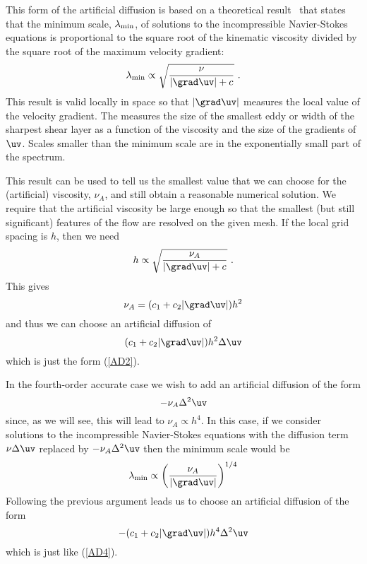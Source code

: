 This form of the artificial diffusion is based on a theoretical
result~\cite{HKR1}\cite{HKR2}
that states that the minimum scale,  $\lambda_{\rm min}$,
 of solutions to the incompressible
Navier-Stokes equations
is proportional to the square
root of the kinematic viscosity divided by the square root of the
maximum velocity gradient:
$$
   \lambda_{\rm min} \propto \sqrt{ \nu \over | \grad\uv | + c} ~.
$$
This result is valid locally in space so that $|\grad\uv|$ measures
the local value of the velocity gradient.
The  measures the
size of the smallest eddy or width of the sharpest shear layer as a
function of the viscosity and the size of the gradients of $\uv$.
Scales smaller than the minimum scale are in the exponentially small
part of the spectrum.

This result can be used to tell us the smallest value that we
can choose for the
(artificial) viscosity, $\nu_A$, and still obtain a reasonable
numerical  solution.
We require that the artificial viscosity
be large enough so that the smallest (but still significant)
features of the flow are resolved
on the given mesh. If the local grid spacing is $h$, then we need
$$
     h  \propto \sqrt{ \nu_A \over | \grad\uv | + c}  ~.
$$
This gives
$$
   \nu_A = (c_1 + c_2 |\grad\uv|) h^2
$$
and thus we can choose an artificial diffusion of
$$
      (c_1 + c_2 |\grad\uv|) h^2 \Delta \uv
$$
which is just the form (\ref{AD2}).


In the fourth-order accurate case we wish to add an artificial
diffusion of the form
$$
      - \nu_A \Delta^2  \uv
$$
since, as we will see, this will lead to $\nu_A \propto h^4$.
In this case, if we consider solutions to the incompressible
Navier-Stokes equations with the diffusion term $\nu\Delta\uv$ replaced
by $ -\nu_A \Delta^2\uv$ then
the minimum scale would be
$$
  \lambda_{\rm min} \propto \left( \nu_A \over | \grad\uv | \right)^{1/4}
$$
Following the previous argument leads us to choose
an artificial diffusion of the form
$$
     -  (c_1 + c_2 |\grad\uv|) h^4 \Delta^2 \uv
$$
which is just like (\ref{AD4}).

